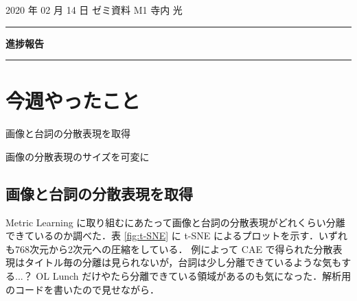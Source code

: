 \documentclass[onecolumn]{ujarticle}   %
\begin{document}
	\noindent

	\hspace{1em}
	2020 年 02 月 14 日
	ゼミ資料
	\hfill
	M1 寺内 光

	\vspace{2mm}

	\hrule

	\begin{center}
		{\Large \bf 進捗報告}
	\end{center}


	\hrule
	\vspace{3mm}

	\section{今週やったこと}
	\begin{itemize}{
		\item{画像と台詞の分散表現を取得}
		\item{画像の分散表現のサイズを可変に}
	}
	\end{itemize}

	\subsection{画像と台詞の分散表現を取得}
	Metric Learning に取り組むにあたって画像と台詞の分散表現がどれくらい分離できているのか調べた．表 \ref{fig:t-SNE} に t-SNE によるプロットを示す．いずれも768次元から2次元への圧縮をしている．
	例によって CAE で得られた分散表現はタイトル毎の分離は見られないが，台詞は少し分離できているような気もする...？ OL Lunch だけやたら分離できている領域があるのも気になった．解析用のコードを書いたので見せながら．
\end{document}

